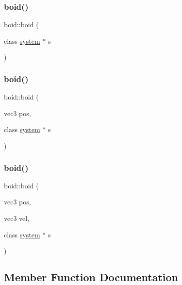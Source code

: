 \subsubsection{\texorpdfstring{boid()}{boid()}\hspace{0.1cm}{\footnotesize\ttfamily [1/3]}}
{\footnotesize\ttfamily boid\+::boid (\begin{DoxyParamCaption}\item[{class \mbox{\hyperlink{classsystem}{system}} $\ast$}]{s }\end{DoxyParamCaption})}

\mbox{\label{classboid_a8e106f9109011ffe00204fb5b83f12c2}} 
\subsubsection{\texorpdfstring{boid()}{boid()}\hspace{0.1cm}{\footnotesize\ttfamily [2/3]}}
{\footnotesize\ttfamily boid\+::boid (\begin{DoxyParamCaption}\item[{vec3}]{pos,  }\item[{class \mbox{\hyperlink{classsystem}{system}} $\ast$}]{s }\end{DoxyParamCaption})}

\mbox{\label{classboid_acd0b39c9563ab3e0f6f4cfbed86fa113}} 
\subsubsection{\texorpdfstring{boid()}{boid()}\hspace{0.1cm}{\footnotesize\ttfamily [3/3]}}
{\footnotesize\ttfamily boid\+::boid (\begin{DoxyParamCaption}\item[{vec3}]{pos,  }\item[{vec3}]{vel,  }\item[{class \mbox{\hyperlink{classsystem}{system}} $\ast$}]{s }\end{DoxyParamCaption})}



\subsection{Member Function Documentation}
\mbox{\label{classboid_adc3958d8172527063c6c181fce9136ff}} 
